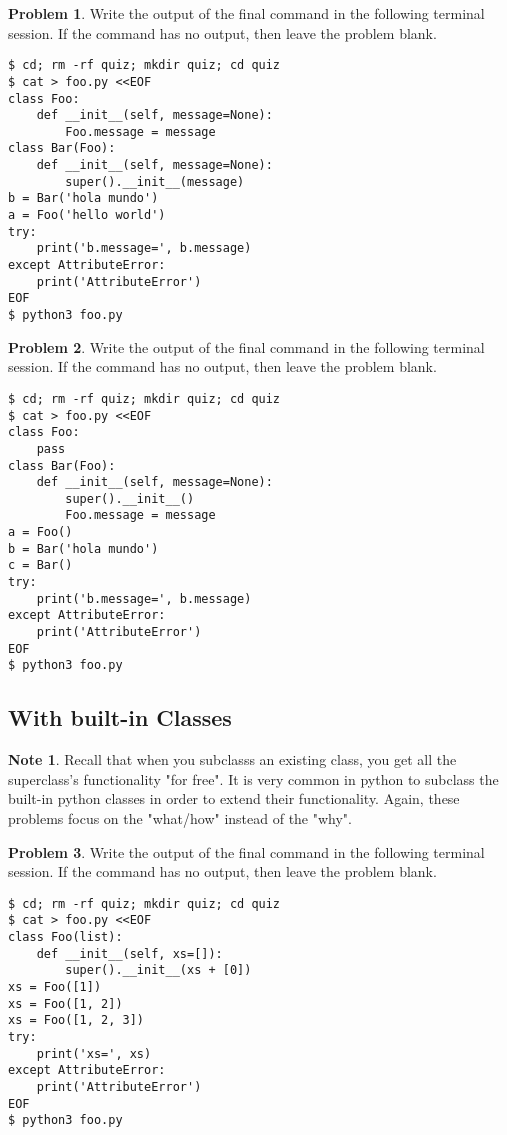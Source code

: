 \documentclass[10pt]{article}
\theoremstyle{definition}
\newtheorem{problem}{Problem}
\newtheorem{note}{Note}
\begin{document}
\filbreak
\begin{problem}
    Write the output of the final command in the following terminal session.
    If the command has no output, then leave the problem blank.
\end{problem}
\begin{lstlisting}
$ cd; rm -rf quiz; mkdir quiz; cd quiz
$ cat > foo.py <<EOF
class Foo:
    def __init__(self, message=None):
        Foo.message = message
class Bar(Foo):
    def __init__(self, message=None):
        super().__init__(message)
b = Bar('hola mundo')
a = Foo('hello world')
try:
    print('b.message=', b.message)
except AttributeError:
    print('AttributeError') 
EOF
$ python3 foo.py
\end{lstlisting}


\filbreak
\begin{problem}
    Write the output of the final command in the following terminal session.
    If the command has no output, then leave the problem blank.
\end{problem}
\begin{lstlisting}
$ cd; rm -rf quiz; mkdir quiz; cd quiz
$ cat > foo.py <<EOF
class Foo:
    pass
class Bar(Foo):
    def __init__(self, message=None):
        super().__init__()
        Foo.message = message
a = Foo()
b = Bar('hola mundo')
c = Bar()
try:
    print('b.message=', b.message)
except AttributeError:
    print('AttributeError') 
EOF
$ python3 foo.py
\end{lstlisting}

\subsection{With built-in Classes}

\begin{note}
    Recall that when you subclasss an existing class, you get all the superclass's functionality "for free".
    It is very common in python to subclass the built-in python classes in order to extend their functionality.
    Again, these problems focus on the "what/how" instead of the "why".
\end{note}

\filbreak
\begin{problem}
    Write the output of the final command in the following terminal session.
    If the command has no output, then leave the problem blank.
\end{problem}
\begin{lstlisting}
$ cd; rm -rf quiz; mkdir quiz; cd quiz
$ cat > foo.py <<EOF
class Foo(list):
    def __init__(self, xs=[]):
        super().__init__(xs + [0])
xs = Foo([1])
xs = Foo([1, 2])
xs = Foo([1, 2, 3])
try:
    print('xs=', xs)
except AttributeError:
    print('AttributeError') 
EOF
$ python3 foo.py
\end{lstlisting}
\end{document}
